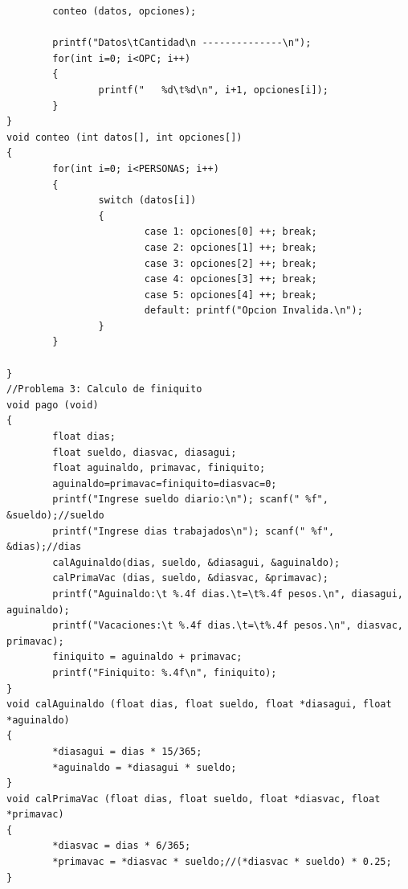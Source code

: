 \documentclass[12pt]{article}
\begin{document}
\begin{lstlisting}
        conteo (datos, opciones);

        printf("Datos\tCantidad\n --------------\n");
        for(int i=0; i<OPC; i++)
        {
                printf("   %d\t%d\n", i+1, opciones[i]);
        }
}
void conteo (int datos[], int opciones[])
{
        for(int i=0; i<PERSONAS; i++)
        {
                switch (datos[i])
                {
                        case 1: opciones[0] ++; break;
                        case 2: opciones[1] ++; break;
                        case 3: opciones[2] ++; break;
                        case 4: opciones[3] ++; break;
                        case 5: opciones[4] ++; break;
                        default: printf("Opcion Invalida.\n");
                }
        }

}
//Problema 3: Calculo de finiquito
void pago (void)
{
        float dias;
        float sueldo, diasvac, diasagui;
        float aguinaldo, primavac, finiquito;
        aguinaldo=primavac=finiquito=diasvac=0;
        printf("Ingrese sueldo diario:\n"); scanf(" %f", &sueldo);//sueldo
        printf("Ingrese dias trabajados\n"); scanf(" %f", &dias);//dias
        calAguinaldo(dias, sueldo, &diasagui, &aguinaldo);
        calPrimaVac (dias, sueldo, &diasvac, &primavac);
        printf("Aguinaldo:\t %.4f dias.\t=\t%.4f pesos.\n", diasagui, aguinaldo);
        printf("Vacaciones:\t %.4f dias.\t=\t%.4f pesos.\n", diasvac, primavac);
        finiquito = aguinaldo + primavac;
        printf("Finiquito: %.4f\n", finiquito);
}
void calAguinaldo (float dias, float sueldo, float *diasagui, float *aguinaldo)
{
        *diasagui = dias * 15/365;
        *aguinaldo = *diasagui * sueldo;
}
void calPrimaVac (float dias, float sueldo, float *diasvac, float *primavac)
{
        *diasvac = dias * 6/365;
        *primavac = *diasvac * sueldo;//(*diasvac * sueldo) * 0.25;
}
\end{lstlisting}
\end{document}
